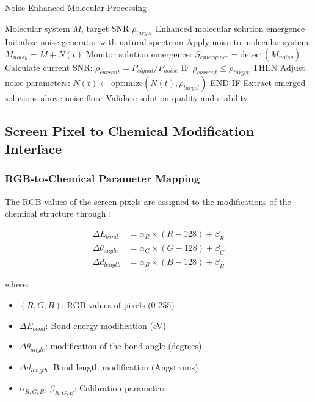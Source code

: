 \documentclass[12pt,a4paper]{article}
\begin{document}
\begin{algorithm}[H]
\caption{Noise-Enhanced Molecular Processing}
\begin{algorithmic}[1]
\REQUIRE Molecular system $M$, target SNR $\rho_{target}$
\ENSURE Enhanced molecular solution emergence
\STATE Initialize noise generator with natural spectrum
\STATE Apply noise to molecular system: $M_{noisy} = M + N(t)$
\STATE Monitor solution emergence: $S_{emergence} = \text{detect}(M_{noisy})$
\STATE Calculate current SNR: $\rho_{current} = P_{signal}/P_{noise}$
\STATE IF $\rho_{current} \le \rho_{target}$ THEN
\STATE \quad Adjust noise parameters: $N(t) \leftarrow \text{optimize}(N(t), \rho_{target})$
\STATE END IF
\STATE Extract emerged solutions above noise floor
\STATE Validate solution quality and stability
\end{algorithmic}
\end{algorithm}

\subsection{Screen Pixel to Chemical Modification Interface}

\subsubsection{RGB-to-Chemical Parameter Mapping}

The RGB values of the screen pixels are assigned to the modifications of the chemical structure through \cite{jensen2017introduction}:

\begin{align}
\Delta E_{bond} &= \alpha_R \times (R - 128) + \beta_R \\
\Delta \theta_{angle} &= \alpha_G \times (G - 128) + \beta_G \\
\Delta d_{length} &= \alpha_B \times (B - 128) + \beta_B
\end{align}

where:
\begin{itemize}
\item $(R, G, B)$: RGB values of pixels (0-255)
\item $\Delta E_{bond}$: Bond energy modification (eV)
\item $\Delta \theta_{angle}$: modification of the bond angle (degrees)
\item $\Delta d_{length}$: Bond length modification (Angstroms)
\item $\alpha_{R,G,B}$, $\beta_{R,G,B}$: Calibration parameters
\end{itemize}
\end{document}
